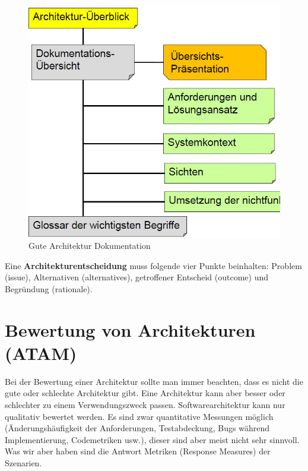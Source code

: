 \begin{figure}[h!]
\centering
\includegraphics[width=0.5\linewidth]{fig/gute-architektur-dokumentation}
\caption{Gute Architektur Dokumentation}
\label{fig:gute-architektur-dokumentation}
\end{figure}

Eine \textbf{Architekturentscheidung} muss folgende vier Punkte beinhalten: Problem (issue), Alternativen (alternatives), getroffener Entscheid (outcome) und Begründung (rationale). 



\section{Bewertung von Architekturen (ATAM)}

Bei der Bewertung einer Architektur sollte man immer beachten, dass es nicht die gute oder schlechte Architektur gibt. Eine Architektur kann aber besser oder schlechter zu einem Verwendungszweck passen. Softwarearchitektur kann nur qualitativ bewertet werden. Es sind zwar quantitative Messungen möglich (Änderungshäufigkeit der Anforderungen, Testabdeckung, Bugs während Implementierung, Codemetriken usw.), dieser sind aber meist nicht sehr sinnvoll. Was wir aber haben sind die Antwort Metriken (Response Measures) der Szenarien.

